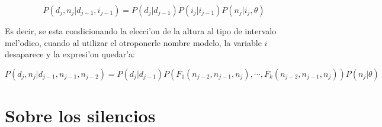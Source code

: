 $$P(d_j, n_j | d_{j-1}, i_{j-1}) = P(d_j|d_{j-1})P(i_j| i_{j-1})P(n_j | i_j, \theta)$$

Es decir, se esta condicionando la elecci'on de la altura al tipo de intervalo mel'odico, cuando al utilizar el otro\alert{ponerle nombre} modelo,
la variable $i$ desaparece y la expresi'on quedar'a:

$$P(d_j, n_j | d_{j-1}, n_{j-1}, n_{j-2}) = P(d_j|d_{j-1})P(F_1(n_{j-2}, n_{j-1}, n_j), \cdots, F_k(n_{j-2}, n_{j-1}, n_j)) P(n_j | \theta)$$

\section{Sobre los silencios}
